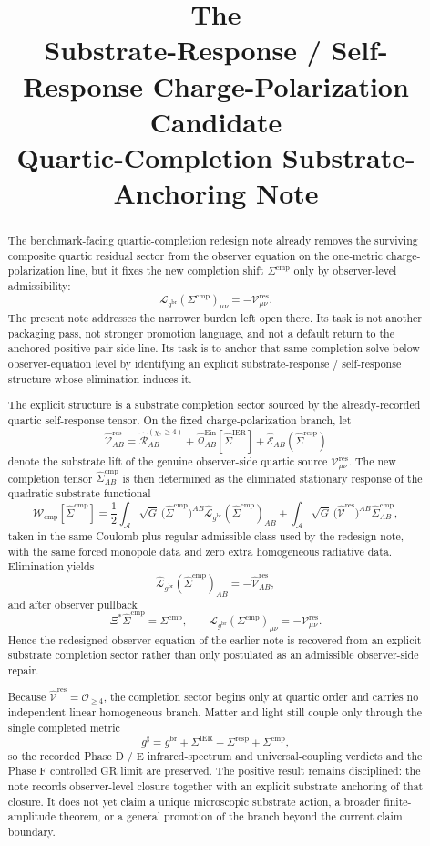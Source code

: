 \documentclass[11pt]{article}
\title{\textbf{The \TheoryName{}}\\[0.4em]
\large Substrate-Response / Self-Response Charge-Polarization Candidate\\
\large Quartic-Completion Substrate-Anchoring Note}
\author{}
\date{}
\newcommand{\Sub}{\mathcal A}
\newcommand{\ObserverMap}{\Xi}
\newcommand{\ObserverMetric}{g^{\mathrm{br}}}
\newcommand{\CompletedMetric}{g^{\sharp}}
\newcommand{\BaseShift}{\Sigma^{\mathrm{IER}}}
\newcommand{\ResponseShift}{\Sigma^{\mathrm{resp}}}
\newcommand{\CompShift}{\Sigma^{\mathrm{cmp}}}
\newcommand{\BaseLift}{\widehat\Sigma^{\mathrm{IER}}}
\newcommand{\ResponseLift}{\widehat\Sigma^{\mathrm{resp}}}
\newcommand{\CompLift}{\widehat\Sigma^{\mathrm{cmp}}}
\newcommand{\ResidualCore}{\mathcal V_{\mu\nu}^{\mathrm{res}}}
\newcommand{\ResidualLift}{\widehat{\mathcal V}^{\mathrm{res}}}
\newcommand{\CompFunctional}{\mathcal W_{\mathrm{cmp}}}
\newcommand{\SubReducedEin}{\widehat{\mathcal L}_{\ObserverMetric}}
\newcommand{\ReducedEin}{\mathcal L_{\ObserverMetric}}
\begin{document}
\maketitle

\begin{abstract}
The benchmark-facing quartic-completion redesign note already removes the surviving composite quartic residual sector from the observer equation on the one-metric charge-polarization line, but it fixes the new completion shift \(\CompShift\) only by observer-level admissibility:
\[
\ReducedEin(\CompShift)_{\mu\nu}=-\ResidualCore.
\]
The present note addresses the narrower burden left open there. Its task is not another packaging pass, not stronger promotion language, and not a default return to the anchored positive-pair side line. Its task is to anchor that same completion solve below observer-equation level by identifying an explicit substrate-response / self-response structure whose elimination induces it.

The explicit structure is a substrate completion sector sourced by the already-recorded quartic self-response tensor. On the fixed charge-polarization branch, let
\[
\ResidualLift_{AB}
=
\widehat{\mathcal R}_{AB}^{(\chi,\ge 4)}
+\widehat{\mathcal Q}_{AB}^{\mathrm{Ein}}[\BaseLift]
+\widehat{\mathcal E}_{AB}(\ResponseLift)
\]
denote the substrate lift of the genuine observer-side quartic source \(\ResidualCore\). The new completion tensor \(\CompLift_{AB}\) is then determined as the eliminated stationary response of the quadratic substrate functional
\[
\CompFunctional[\CompLift]
=
\frac12\int_{\Sub}\sqrt{G}\,\bigl(\CompLift\bigr)^{AB}\SubReducedEin(\CompLift)_{AB}
+\int_{\Sub}\sqrt{G}\,\bigl(\ResidualLift\bigr)^{AB}\CompLift_{AB},
\]
taken in the same Coulomb-plus-regular admissible class used by the redesign note, with the same forced monopole data and zero extra homogeneous radiative data. Elimination yields
\[
\SubReducedEin(\CompLift)_{AB}=-\ResidualLift_{AB},
\]
and after observer pullback
\[
\ObserverMap^*\CompLift=\CompShift,
\qquad
\ReducedEin(\CompShift)_{\mu\nu}=-\ResidualCore.
\]
Hence the redesigned observer equation of the earlier note is recovered from an explicit substrate completion sector rather than only postulated as an admissible observer-side repair.

Because \(\ResidualLift=\mathcal O_{\ge 4}\), the completion sector begins only at quartic order and carries no independent linear homogeneous branch. Matter and light still couple only through the single completed metric
\[
\CompletedMetric
=
\ObserverMetric+\BaseShift+\ResponseShift+\CompShift,
\]
so the recorded Phase D / E infrared-spectrum and universal-coupling verdicts and the Phase F controlled GR limit are preserved. The positive result remains disciplined: the note records observer-level closure together with an explicit substrate anchoring of that closure. It does not yet claim a unique microscopic substrate action, a broader finite-amplitude theorem, or a general promotion of the branch beyond the current claim boundary.
\end{abstract}
\end{document}
